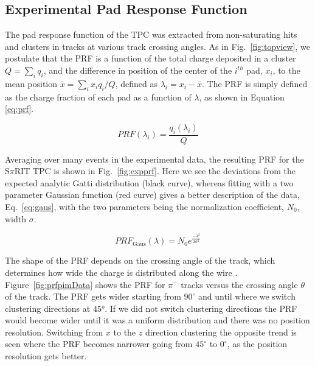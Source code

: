 \subsection{Experimental Pad Response Function}
\label{sec:expPRF}
The pad response function of the TPC was extracted from non-saturating hits and clusters in tracks at various track crossing angles. As in Fig.~\ref{fig:topview}, we postulate that the PRF is a function of the total charge deposited in a cluster $Q = \sum_i q_i$, and the difference in position of the center of the $i^{th}$ pad, $x_i$, to the mean position $\bar{x} = \sum_i x_i q_i/Q$, defined as $\lambda_i = x_i-\bar{x}$. The PRF is simply defined as the charge fraction of each pad as a function of $\lambda$, as shown in Equation \ref{eq:prf}. 

\begin{equation}\label{eq:prf}
PRF(\lambda_i) = \frac{q_i(\lambda_i)}{Q}
\end{equation}

Averaging over many events in the experimental data, the resulting PRF for the S$\pi$RIT TPC is shown in Fig.~\ref{fig:expprf}. Here we see the deviations from the expected analytic Gatti distribution (black curve), whereas fitting with a two parameter Gaussian function (red curve) gives a better description of the data, Eq.~\ref{eq:gaus}, with the two parameters being the normalization coefficient, $N_0$, width $\sigma$.

\begin{equation}\label{eq:gaus}
PRF_{\mathrm{Gaus}}(\lambda) = N_0 e^\frac{-\lambda^2}{2\sigma^2}
\end{equation}

\begin{comment}
\begin{figure}[ht!]s
\begin{overpic}[width=\linewidth]{fig5.pdf}
\put(61,55){\contour{white}{ PRF${}_{\mathrm{Gaus}}(\lambda)$ eq. \ref{eq:gaus}  }}
\put(61,49){\contour{white}{ PRF${}_{\mathrm{Gatti}}(\lambda)$ eq. \ref{eq:gatti} }}
\end{overpic}
\caption{Experimental pad response function of many events for a crossing angle of $85^{\circ} < \theta \leq 90^{\circ}$.  }
\label{fig:expprf}
\end{figure}
\end{comment}


The shape of the PRF depends on the crossing angle of the track, which determines how wide the charge is distributed along the wire \cite{gatti}. Figure~\ref{fig:prfpimData} shows the PRF for $\pi^-$ tracks versus the crossing angle $\theta$ of the track. The PRF gets wider starting from $90^{\circ}$  and until where we switch clustering directions at $\ang{45}$. If we did not switch clustering directions the PRF would become wider until it was a uniform distribution and there was no position resolution. Switching from $x$ to the $z$ direction clustering the opposite trend is seen where the PRF becomes narrower  going from $45^{\circ}$ to $0^{\circ}$, as the position resolution gets better.


